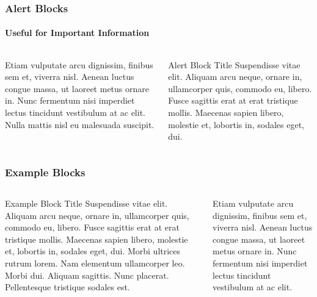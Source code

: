 \documentclass[
	aspectratio=169, %
	12pt, %
	t, %
]{beamer}
\begin{document}

\begin{frame}
	\frametitle{Alert Blocks}
	\framesubtitle{Useful for Important Information}

	\begin{columns}[T]
		\begin{column}{0.45\textwidth}
			Etiam vulputate arcu dignissim, finibus sem et, viverra nisl. Aenean luctus congue massa, ut laoreet metus ornare in. Nunc fermentum nisi imperdiet lectus tincidunt vestibulum at ac elit. Nulla mattis nisl eu malesuada suscipit.
		\end{column}
		
		\hfill

		\begin{column}{0.45\textwidth}
			\vspace*{-\baselineskip} %
			\begin{alertblock}{Alert Block Title}
				Suspendisse vitae elit. Aliquam arcu neque, ornare in, ullamcorper quis, commodo eu, libero. Fusce sagittis erat at erat tristique mollis. Maecenas sapien libero, molestie et, lobortis in, sodales eget, dui.
			\end{alertblock}
		\end{column}
	\end{columns}
\end{frame}


\begin{frame}
	\frametitle{Example Blocks}

	\begin{columns}[T]
		\begin{column}{0.6\textwidth}
			\vspace*{-\baselineskip} %
			\begin{exampleblock}{Example Block Title}
				Suspendisse vitae elit. Aliquam arcu neque, ornare in, ullamcorper quis, commodo eu, libero. Fusce sagittis erat at erat tristique mollis. Maecenas sapien libero, molestie et, lobortis in, sodales eget, dui. Morbi ultrices rutrum lorem. Nam elementum ullamcorper leo. Morbi dui. Aliquam sagittis. Nunc placerat. Pellentesque tristique sodales est.
			\end{exampleblock}
		\end{column}

		\hfill

		\begin{column}{0.3\textwidth}
			Etiam vulputate arcu dignissim, finibus sem et, viverra nisl. Aenean luctus congue massa, ut laoreet metus ornare in. Nunc fermentum nisi imperdiet lectus tincidunt vestibulum at ac elit.
		\end{column}
	\end{columns}
\end{frame}
\end{document}
